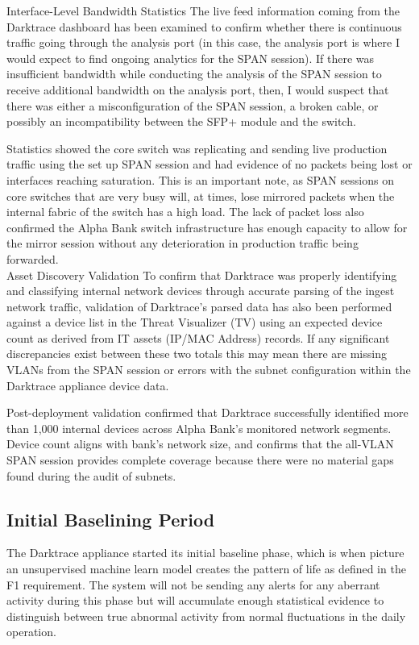 \documentclass[12pt,a4paper]{report}
\begin{document}
Interface-Level Bandwidth Statistics 
The live feed information coming from the Darktrace dashboard has been examined to confirm whether there is continuous traffic going through the analysis port (in this case, the analysis port is where I would expect to find ongoing analytics for the SPAN session). If there was insufficient bandwidth while conducting the analysis of the SPAN session to receive additional bandwidth on the analysis port, then, I would suspect that there was either a misconfiguration of the SPAN session, a broken cable, or possibly an incompatibility between the SFP+ module and the switch.

Statistics showed the core switch was replicating and sending live production traffic using the set up SPAN session and had evidence of no packets being lost or interfaces reaching saturation. This is an important note, as SPAN sessions on core switches that are very busy will, at times, lose mirrored packets when the internal fabric of the switch has a high load. The lack of packet loss also confirmed the Alpha Bank switch infrastructure has enough capacity to allow for the mirror session without any deterioration in production traffic being forwarded. \\

Asset Discovery Validation 
To confirm that Darktrace was properly identifying and classifying internal network devices through accurate parsing of the ingest network traffic, validation of Darktrace’s parsed data has also been performed against a device list in the Threat Visualizer (TV) using an expected device count as derived from IT assets (IP/MAC Address) records. If any significant discrepancies exist between these two totals this may mean there are missing VLANs from the SPAN session or errors with the subnet configuration within the Darktrace appliance device data.

Post-deployment validation confirmed that Darktrace successfully identified more than 1,000 internal devices across Alpha Bank’s monitored network segments. Device count aligns with bank’s network size, and confirms that the all-VLAN SPAN session provides complete coverage because there were no material gaps found during the audit of subnets.

\subsection{Initial Baselining Period}
The Darktrace appliance started its initial baseline phase, which is when picture an unsupervised machine learn model creates the pattern of life as defined in the F1 requirement. The system will not be sending any alerts for any aberrant activity during this phase but will accumulate enough statistical evidence to distinguish between true abnormal activity from normal fluctuations in the daily operation.\\
\end{document}
